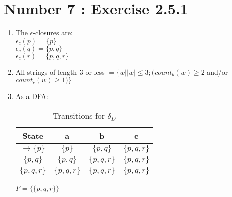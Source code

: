 \documentclass[12pt,a4paper,twoside]{article}  %
\begin{document}
\section{Number 7 : Exercise 2.5.1}
\begin{enumerate}
\item The $\epsilon$-closures are: \\
 $\epsilon_c(p) = \{p\}$ \\
 $\epsilon_c(q) = \{p, q\}$ \\
 $\epsilon_c(r) = \{p, q, r\}$

\item All strings of length 3 or less $= \{w | |w| \leq 3; (count_b(w)
  \geq 2$ and/or $count_c(w) \geq 1)\}$

\item As a DFA:
\begin{table}
\begin{tabular}{c || c | c | c}
State                   &a              &b         &c \\
\hline\hline
$\rightarrow \{p\}$     & $\{p\}$       & $\{p, q\}$    & $\{p, q, r\}$ \\
$\{p, q\}$              & $\{p, q\}$    & $\{p, q, r\}$ & $\{p, q, r\}$ \\
$\{p, q, r\}$           & $\{p, q, r\}$ & $\{p, q, r\}$ & $\{p, q, r\}$
\end{tabular}
\caption{Transitions for $\delta_D$}\label{2.5.1.c}
\end{table}

$F = \{\{p, q, r\}\}$

\end{enumerate}
  
\end{document}
